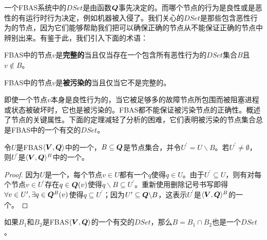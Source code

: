 一个FBAS系统中的$DSet$是由{\quorum}函数${\bm Q}$事先决定的。而哪个节点的行为是良性或是恶性的有运行时行为决定，例如机器被入侵了。我们关心的$DSet$是那些包含恶性行为的节点，因为它们能够帮助我们把可以确保正确的节点从不能保证正确的节点中辨别出来。有鉴于此，我们引入下面的术语：

\begin{definition}[完整的]
	FBAS中的节点$v$是\textbf{完整的}当且仅当存在一个包含所有恶性行为的$DSet$集合$B$且$v\not\in B$。
\end{definition}

\begin{definition}[被污染的]
	FBAS中的节点$v$是\textbf{被污染的}当且仅当它不是完整的。
\end{definition}

即使一个节点$v$本身是良性行为的，当它被足够多的故障节点所包围而被阻塞进程或状态被破坏时，它也是被污染的。FBAS都不能保证被污染节点的正确性。概述了节点的关键属性。下面的定理减轻了分析的困难，它们表明被污染的节点集合总是FBAS中的一个有{\quorum}交的$DSet$。

\begin{theorem}\label{th1}
	令$U$是FBAS$\langle{\bm V},{\bm Q}\rangle$中的一个{\quorum}，$B\subseteq {\bm Q}$是节点集合，并令$U^\prime=U\backslash B$。若$U^\prime\neq \emptyset$，则$U^\prime$是$\langle{\bm V},{\bm Q}\rangle^B$中的一个{\quorum}。
\end{theorem}

\begin{proof}
	因为$U$是一个{\quorum}，每个节点$v\in U$都有一个$q$使得$q\in U$。由于$U^\prime\subseteq U$，则有对每个节点$v\in U^\prime$存在$q\in{\bm Q}(v)$使得$q\backslash B\subseteq U^\prime$。重新使用删除记号书写即得$\forall v\in U^\prime,\exists q\in{\bm Q}^B(v)$使得$q\subseteq U^\prime$；因为$U^\prime \subseteq {\bm Q}\backslash B$，这表示$U^\prime$是$\langle{\bm V},{\bm Q}\rangle^B$的一个{\quorum}。
\end{proof}

\begin{theorem}\label{th2}
	如果$B_1$和$B_2$是FBAS$\langle{\bm V},{\bm Q}\rangle$的一个有{\quorum}交的$DSet$，那么$B=B_1\cap B_2$也是一个$DSet$。
\end{theorem}

